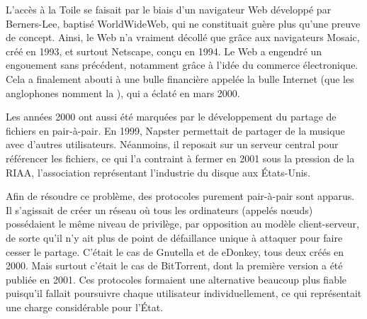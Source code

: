 L'accès à la Toile se faisait par le biais d'un navigateur Web développé par Berners-Lee, baptisé WorldWideWeb, qui ne constituait guère plus qu'une preuve de concept. Ainsi, le Web n'a vraiment décollé que grâce aux navigateurs Mosaic, créé en 1993, et surtout Netscape, conçu en 1994. Le Web a engendré un engouement sans précédent, notamment grâce à l'idée du commerce électronique. Cela a finalement abouti à une bulle financière appelée la bulle Internet (que les anglophones nomment la ), qui a éclaté en mars 2000.

Les années 2000 ont aussi été marquées par le développement du partage de fichiers en pair-à-pair. En 1999, Napster permettait de partager de la musique avec d'autres utilisateurs. Néanmoins, il reposait sur un serveur central pour référencer les fichiers, ce qui l'a contraint à fermer en 2001 sous la pression de la RIAA, l'association représentant l'industrie du disque aux États-Unis.

Afin de résoudre ce problème, des protocoles purement pair-à-pair sont apparus. Il s'agissait de créer un réseau où tous les ordinateurs (appelés nœuds) possédaient le même niveau de privilège, par opposition au modèle client-serveur, de sorte qu'il n'y ait plus de point de défaillance unique à attaquer pour faire cesser le partage. C'était le cas de Gnutella et de eDonkey, tous deux créés en 2000. Mais surtout c'était le cas de BitTorrent, dont la première version a été publiée en 2001. Ces protocoles formaient une alternative beaucoup plus fiable puisqu'il fallait poursuivre chaque utilisateur individuellement, ce qui représentait une charge considérable pour l'État.


